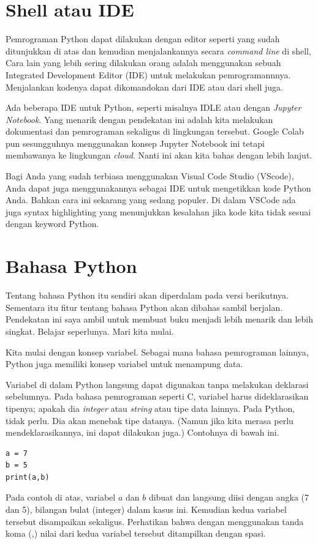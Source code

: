 \section{Shell atau IDE}
Pemrograman Python dapat dilakukan dengan editor seperti yang sudah ditunjukkan
di atas dan kemudian menjalankannya secara {\em command line} di shell,
Cara lain yang lebih sering dilakukan orang adalah menggunakan sebuah
Integrated Development Editor (IDE) untuk melakukan pemrogramannnya.
Menjalankan kodenya dapat dikomandokan dari IDE atau dari shell juga.

Ada beberapa IDE untuk Python, seperti misalnya IDLE atau dengan
{\em Jupyter Notebook}.
Yang menarik dengan pendekatan ini adalah kita melakukan dokumentasi dan
pemrograman sekaligus di lingkungan tersebut.
Google Colab pun sesungguhnya menggunakan konsep Jupyter Notebook ini tetapi
membawanya ke lingkungan {\em cloud}.
Nanti ini akan kita bahas dengan lebih lanjut.

Bagi Anda yang sudah terbiasa menggunakan Visual Code Studio (VScode),
Anda dapat juga menggunakannya sebagai IDE untuk mengetikkan kode Python Anda.
Bahkan cara ini sekarang yang sedang populer.
Di dalam VSCode ada juga syntax highlighting yang menunjukkan kesalahan 
jika kode kita tidak sesuai dengan keyword Python.

\section{Bahasa Python} 
Tentang bahasa Python itu sendiri akan diperdalam pada versi berikutnya.
Sementara itu fitur tentang bahasa Python akan dibahas sambil berjalan.
Pendekatan ini saya ambil untuk membuat buku menjadi lebih menarik dan lebih
singkat. Belajar seperlunya. Mari kita mulai.

Kita mulai dengan konsep variabel. Sebagai mana bahasa pemrograman lainnya,
Python juga memiliki konsep variabel untuk menampung data.

Variabel di dalam Python langsung dapat digunakan tanpa melakukan deklarasi
sebelumnya. Pada bahasa pemrograman seperti C, variabel harus dideklarasikan
tipenya; apakah dia {\em integer} atau {\em string} atau tipe data lainnya.
Pada Python, tidak perlu. Dia akan menebak tipe datanya. 
(Namun jika kita merasa perlu mendeklarasikannya, ini dapat dilakukan juga.)
Contohnya di bawah ini.
\begin{verbatim}
a = 7
b = 5
print(a,b)
\end{verbatim}
Pada contoh di atas, variabel $a$ dan $b$ dibuat dan langsung diisi dengan
angka (7 dan 5), bilangan bulat (integer) dalam kasus ini.
Kemudian kedua variabel tersebut disampaikan sekaligus.
Perhatikan bahwa dengan menggunakan tanda koma (,) nilai dari kedua variabel
tersebut ditampilkan dengan spasi.

